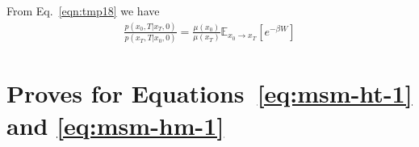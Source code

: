 \documentclass[aps, pre, preprint,unsortedaddress,a4paper,onecolumn]{revtex4}
\newcommand{\mc}[0]{\mathcal {C}}
\begin{document}
From Eq.~\eqref{eqn:tmp18} we have
\begin{align}
  \label{eq:tmp22}
  \frac{p(x_0,T\vert x_T,0)}{  p(x_T,T\vert x_0,0)  }
  =
  \frac{\mu(x_0)}{\mu(x_T)}
  \mathbb E_{x_0\rightarrow x_T} [e^{-\beta W}]
\end{align}


\section{Proves for Equations~\eqref{eq:msm-ht-1} and \eqref{eq:msm-hm-1} }
\label{sec:app-prove}
\end{document}
